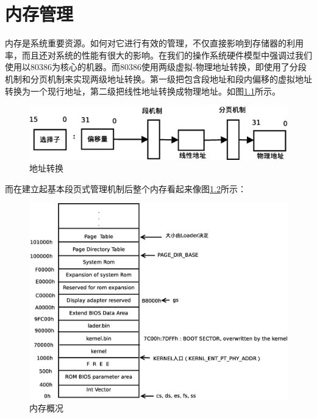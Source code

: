 \documentclass[UTF8,nofonts,cs4size]{ctexrep}
\begin{document}
\chapter{内存管理}
内存是系统重要资源。如何对它进行有效的管理，不仅直接影响到存储器的利用率，而且还对系统的性能有很大的影响。在我们的操作系统硬件模型中强调过我们使用以80386为核心的机器。而80386使用两级虚拟-物理地址转换，即使用了分段机制和分页机制来实现两级地址转换。第一级把包含段地址和段内偏移的虚拟地址转换为一个现行地址，第二级把线性地址转换成物理地址。如图\ref{machine}所示。
\begin{figure}[htp]
\centering
\includegraphics[scale=0.36]{machine.eps}
\caption{地址转换}
\label{machine}
\end{figure}

而在建立起基本段页式管理机制后整个内存看起来像图\ref{neicun}所示：
\begin{figure}[htp]
\centering
\includegraphics[scale=0.36]{neicun.eps}
\caption{内存概况}
\label{neicun}
\end{figure}
\end{document}
